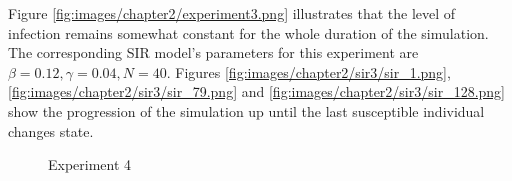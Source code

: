 
Figure \ref{fig:images/chapter2/experiment3.png} illustrates that the level of infection remains somewhat constant for the whole duration of the simulation.
The corresponding SIR model's parameters for this experiment are $\beta = 0.12, \gamma = 0.04, N = 40$.
Figures \ref{fig:images/chapter2/sir3/sir_1.png}, \ref{fig:images/chapter2/sir3/sir_79.png} and \ref{fig:images/chapter2/sir3/sir_128.png} show the progression of the simulation up until the last susceptible individual changes state.

\begin{figure}[h]
    \centering
    \hspace*{\fill}
    \hspace*{\fill}

    \caption{Experiment 4} \label{fig:experiment3}
\end{figure}

